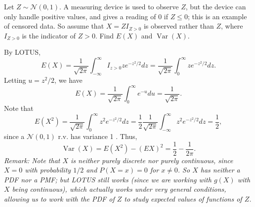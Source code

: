 

\setcounter{theorem}{33}
\begin{exercise}[BH.5.34] Let $Z \sim \mathcal{N}(0,1)$. A measuring device is used to observe $Z$, but the device can only handle positive values, and gives a reading of 0 if $Z \leq 0$; this is an example of censored data. So assume that $X=Z I_{Z>0}$ is observed rather than $Z$, where $I_{Z>0}$ is the indicator of $Z>0$. Find $E(X)$ and $\operatorname{Var}(X)$.
\begin{solution}
    By LOTUS,
		$$
		E(X)=\frac{1}{\sqrt{2 \pi}} \int_{-\infty}^{\infty} I_{z>0} z e^{-z^2 / 2} d z=\frac{1}{\sqrt{2 \pi}} \int_0^{\infty} z e^{-z^2 / 2} d z .
		$$
		Letting $u=z^2 / 2$, we have
		$$
		E(X)=\frac{1}{\sqrt{2 \pi}} \int_0^{\infty} e^{-u} d u=\frac{1}{\sqrt{2 \pi}} .
		$$
		Note that
		$$
		E\left(X^2\right)=\frac{1}{\sqrt{2 \pi}} \int_0^{\infty} z^2 e^{-z^2 / 2} d z=\frac{1}{2} \frac{1}{\sqrt{2 \pi}} \int_{-\infty}^{\infty} z^2 e^{-z^2 / 2} d z=\frac{1}{2},
		$$
		since a $\mathcal{N}(0,1)$ r.v. has variance 1 . Thus, 
		$$
		\operatorname{Var}(X)=E\left(X^2\right)-(E X)^2=\frac{1}{2}-\frac{1}{2 \pi} .
		$$
		\textit{Remark:  Note that $X$ is neither purely discrete nor purely continuous, since $X=0$ with probability $1 / 2$ and $P(X=x)=0$ for $x \neq 0$. So $X$ has neither a PDF nor a PMF; but LOTUS still works (since we are working with $g(X)$ with $X$ being continuous), which actually works under very general conditions, allowing us to work with the PDF of $Z$ to study expected values of functions of $Z$.}
\end{solution}
\end{exercise}


